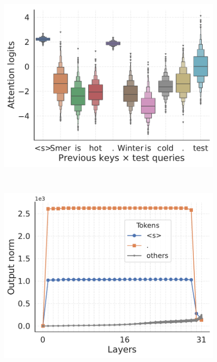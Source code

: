 
\begin{figure}[t]
  \centering
  \begin{minipage}{0.33\textwidth}
      \centering
      \label{fig:circuit-attn-logits}
      \vspace{-.2em}
      \includegraphics[width=\linewidth]{Figures/figures_circuit/logits.pdf}
  \end{minipage}~
  \begin{minipage}{0.33\textwidth}
      \centering
      \label{fig:circuit-massive-norm}
      \vspace{-.2em}
      \includegraphics[width=\linewidth]{Figures/figures_circuit/massive.pdf}

\end{minipage}
\end{figure}
